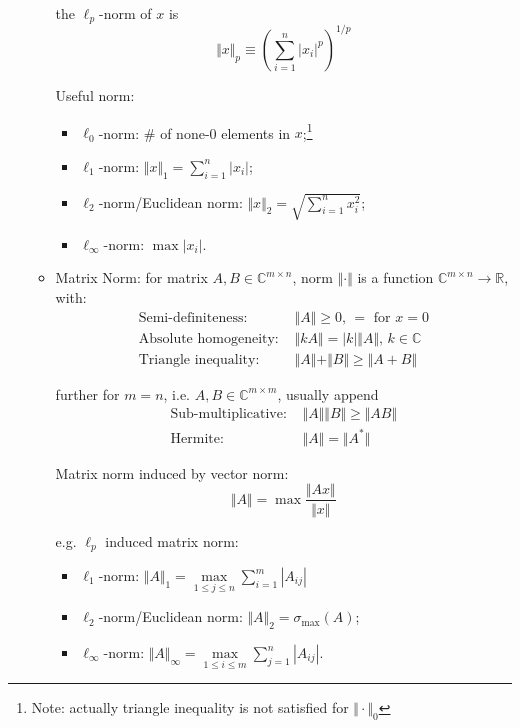\begin{itemize}[topsep=6pt,itemsep=4pt]
\begin{itemize}[topsep=2pt,itemsep=0pt]
        
        the $ \ell_p $-norm of $ x $ is
        \begin{equation}
            \Vert x\Vert _p\equiv \left( \sum_{i=1}^n| x_i|^p \right)^{1/p}
        \end{equation}

        Useful norm:
        \begin{itemize}[topsep=2pt,itemsep=2pt]
            \item $ \ell_0$-norm: \# of none-0 elements in $ x $;\footnote{Note: actually triangle inequality is not satisfied for $ \Vert \cdot \Vert _0 $}
            \item $ \ell_1 $-norm: $ \Vert x\Vert _1=\sum_{i=1}^n|x_i| $;
            \item $ \ell_2 $-norm/Euclidean norm: $ \Vert x\Vert _2=\sqrt{\sum_{i=1}^n x_i^2}  $;
            \item $ \ell_\infty $-norm: $ \max |x_i| $.
        \end{itemize}
        \item Matrix Norm:  for matrix $ A,B\in \mathbb{C}^{m\times n} $, norm $ \Vert \cdot \Vert  $ is a function $ \mathbb{C}^{m\times n}\to \mathbb{R} $, with:
        \begin{align}
            \text{Semi-definiteness: }&\Vert A \Vert \geq 0,\, =\text{ for }x=0\\
            \text{Absolute homogeneity: }&\Vert kA \Vert = |k|\Vert A \Vert,\, k\in \mathbb{C} \\
            \text{Triangle inequality: }& \Vert A \Vert + \Vert B \Vert \geq \Vert A+B \Vert 
        \end{align}

        further for $ m=n $, i.e. $ A,B\in \mathbb{C}^{m\times m} $, usually append
        \begin{align}
            \text{Sub-multiplicative: }&\Vert A \Vert \Vert B \Vert \geq \Vert AB \Vert \\
            \text{Hermite: }&\Vert A \Vert =\Vert A^* \Vert 
        \end{align}

        Matrix norm induced by vector norm:
        \begin{equation}
            \Vert A \Vert =\max \dfrac{\Vert Ax \Vert }{\Vert x \Vert } 
        \end{equation}
        
        e.g. $ \ell_p $ induced matrix norm:
        \begin{itemize}[topsep=2pt,itemsep=2pt]
            \item $ \ell_1 $-norm: $ \Vert A\Vert _1=\mathop{\max}\limits_{1\leq j\leq n}\sum\limits_{i=1}^m|A_{ij}| $
            \item $ \ell_2 $-norm/Euclidean norm: $ \Vert A\Vert _2=\sigma_{\max}(A) $;
            \item $ \ell_\infty $-norm: $ \Vert A\Vert _\infty=\mathop{\max}\limits_{1\leq i\leq m}\sum\limits_{j=1}^n|A_{ij}| $.
        \end{itemize}


\end{itemize}
\end{itemize}
